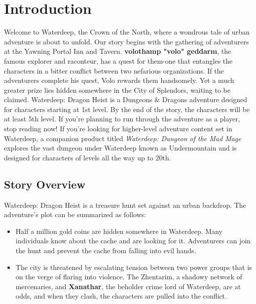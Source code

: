 \documentclass[10pt,a4paper,twoside,twocolumn,openany,nodeprecatedcode]{dndbook}
\begin{document}
\chapter{Introduction}
Welcome to Waterdeep, the Crown of the North, where a wondrous tale of urban adventure is about to unfold. Our story begins with the gathering of adventurers at the Yawning Portal Inn and Tavern. \textbf{volothamp "volo" geddarm}, the famous explorer and raconteur, has a quest for them-one that entangles the characters in a bitter conflict between two nefarious organizations. If the adventurers complete his quest, Volo rewards them handsomely. Yet a much greater prize lies hidden somewhere in the City of Splendors, waiting to be claimed. Waterdeep: Dragon Heist is a Dungeons \& Dragons adventure designed for characters starting at 1st level. By the end of the story, the characters will be at least 5th level. If you're planning to run through the adventure as a player, stop reading now!
If you're looking for higher-level adventure content set in Waterdeep, a companion product titled \textit{Waterdeep: Dungeon of the Mad Mage} explores the vast dungeon under Waterdeep known as Undermountain and is designed for characters of levels all the way up to 20th.
\section{Story Overview}
Waterdeep: Dragon Heist is a treasure hunt set against an urban backdrop. The adventure's plot can be summarized as follows:
\begin{itemize}

\item Half a million gold coins are hidden somewhere in Waterdeep. Many individuals know about the cache and are looking for it. Adventurers can join the hunt and prevent the cache from falling into evil hands.
\item The city is threatened by escalating tension between two power groups that is on the verge of flaring into violence. The Zhentarim, a shadowy network of mercenaries, and \textbf{Xanathar}, the beholder crime lord of Waterdeep, are at odds, and when they clash, the characters are pulled into the conflict.
\end{itemize}
\end{document}
